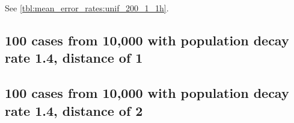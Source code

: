 See \autoref{tbl:mean_error_rates:unif_200_1_1h}.

\begin{table}[H]
\centering
\scriptsize

    \begin{subtable}{0.5\textwidth}
    
    \caption{Means} 
    \end{subtable}%
    \begin{subtable}{0.5\textwidth}
    
    \caption{Standard deviations} 
    \end{subtable}

\caption{Error rates for uniform population of 10,000, single peak intensity of factor 100 and decay rate 1.4, distance between population peak and risk peak is 0}
\label{tbl:mean_error_rates:p1.4_100_1_1h:2}
\end{table}

\subsection{100 cases from 10,000 with population decay rate 1.4, distance of 1}
\begin{table}[H]
\centering
\scriptsize

    \begin{subtable}{0.5\textwidth}
    
    \caption{Means} 
    \end{subtable}%
    \begin{subtable}{0.5\textwidth}
    
    \caption{Standard deviations} 
    \end{subtable}

\caption{Error rates for uniform population of 10,000, single peak intensity of factor 100 and decay rate 1.4, distance between population peak and risk peak is 1}
\label{tbl:mean_error_rates:p1.4_100_1_1h_1s}
\end{table}

\subsection{100 cases from 10,000 with population decay rate 1.4, distance of 2}
\begin{table}[H]
\centering
\scriptsize

    \begin{subtable}{0.5\textwidth}
    
    \caption{Means} 
    \end{subtable}%
    \begin{subtable}{0.5\textwidth}
    
    \caption{Standard deviations} 
    \end{subtable}

\caption{Error rates for uniform population of 10,000, single peak intensity of factor 100 and decay rate 1.4, distance between population peak and risk peak is 2}
\label{tbl:mean_error_rates:p1.4_100_1_1h_2s}
\end{table}

